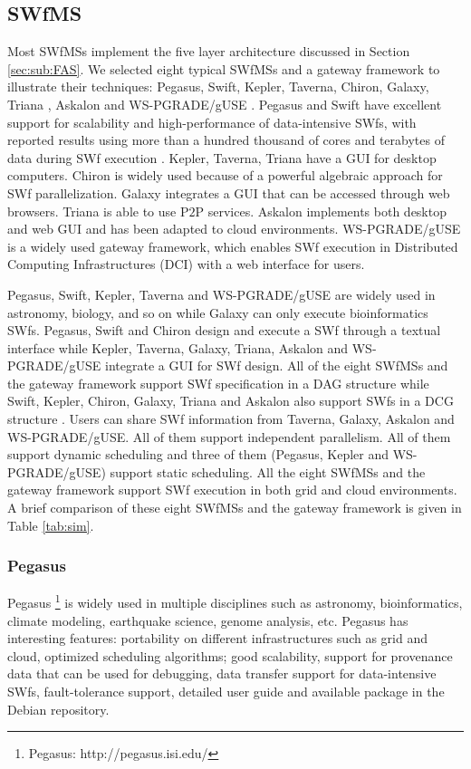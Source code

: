 \subsection{SWfMS}
Most SWfMSs implement the five layer architecture discussed in Section \ref{sec:sub:FAS}.
We selected eight typical SWfMSs and a gateway framework to illustrate their techniques: Pegasus,
Swift, Kepler, Taverna, Chiron, Galaxy, Triana \cite{Taylor2007}, Askalon \cite{Fahringer2007} and WS-PGRADE/gUSE \cite{Kacsuk2012}. 
Pegasus and Swift have excellent support for scalability and high-performance of data-intensive SWfs, with reported results using more than a hundred thousand of cores and terabytes of data during SWf execution \cite{Deelman2014,Zhao2007}.
Kepler, Taverna, Triana have a GUI for
desktop computers. Chiron is widely used because of a powerful algebraic approach for SWf parallelization. 
Galaxy integrates a GUI that can
be accessed through web browsers. Triana is able to use P$2$P services. 
Askalon implements both desktop and web GUI and has been adapted to cloud environments.
WS-PGRADE/gUSE is a widely used gateway framework, which enables SWf execution in Distributed Computing Infrastructures (DCI) with a web interface for users. 


Pegasus, Swift, Kepler, Taverna and WS-PGRADE/gUSE are widely used in astronomy, biology, and so on while Galaxy can only execute bioinformatics SWfs.
Pegasus, Swift and Chiron design and execute a SWf
through a textual interface while Kepler, Taverna, Galaxy, Triana, Askalon and WS-PGRADE/gUSE integrate a GUI for SWf design.
All of the eight SWfMSs and the gateway framework support SWf specification in a DAG
structure while Swift, Kepler, Chiron, Galaxy, Triana and Askalon also support SWfs in a DCG structure \cite{Yu2005}.
Users can share SWf information from Taverna, Galaxy, Askalon and WS-PGRADE/gUSE. 
All of them support independent parallelism. 
All of them support dynamic scheduling and three of them (Pegasus, Kepler and WS-PGRADE/gUSE) support static scheduling. All the eight SWfMSs and the gateway framework support SWf execution in both grid and cloud environments.
A brief comparison of these eight SWfMSs and the gateway framework is given in Table \ref{tab:sim}. 

\subsubsection{Pegasus} 

Pegasus%
\footnote{Pegasus: http://pegasus.isi.edu/%
} \cite{Deelman2014} is widely used in multiple disciplines such as astronomy,
bioinformatics, climate modeling, earthquake science, genome analysis, etc. 
Pegasus has interesting features: portability on different infrastructures such as grid and cloud,
optimized scheduling algorithms; good scalability,
support for provenance data that can be used for debugging,
data transfer support for data-intensive SWfs,
fault-tolerance support, detailed user guide \cite{PegasusUserGuide} and available package in the Debian repository.


